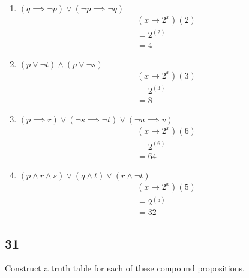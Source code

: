 \documentclass{article}
\begin{document}
\begin{enumerate}[label = \boldalph]
	\item $ \left( q \implies \neg p \right) \lor \left( \neg p \implies \neg q \right) $
	      \begin{align*}
		       & \left( x \mapsto 2^{x} \right) \left( 2 \right) \\
		       & = 2^{(2)}                                       \\
		       & = 4
	      \end{align*}

	\item $ \left( p \lor \neg t \right) \land \left( p \lor \neg s \right) $
	      \begin{align*}
		       & \left( x \mapsto 2^{x} \right) \left( 3 \right) \\
		       & = 2^{(3)}                                       \\
		       & = 8
	      \end{align*}

	\item $ \left( p \implies r \right) \lor \left( \neg s \implies \neg t \right) \lor \left( \neg u \implies v \right) $
	      \begin{align*}
		       & \left( x \mapsto 2^{x} \right) \left( 6 \right) \\
		       & = 2^{(6)}                                       \\
		       & = 64
	      \end{align*}

	\item $ \left( p \land r \land s \right) \lor \left( q \land t \right) \lor \left( r \land \neg t \right) $
	      \begin{align*}
		       & \left( x \mapsto 2^{x} \right) \left( 5 \right) \\
		       & = 2^{(5)}                                       \\
		       & = 32
	      \end{align*}
\end{enumerate}

\subsection{31}

Construct a truth table for each of these compound propositions.
\end{document}
